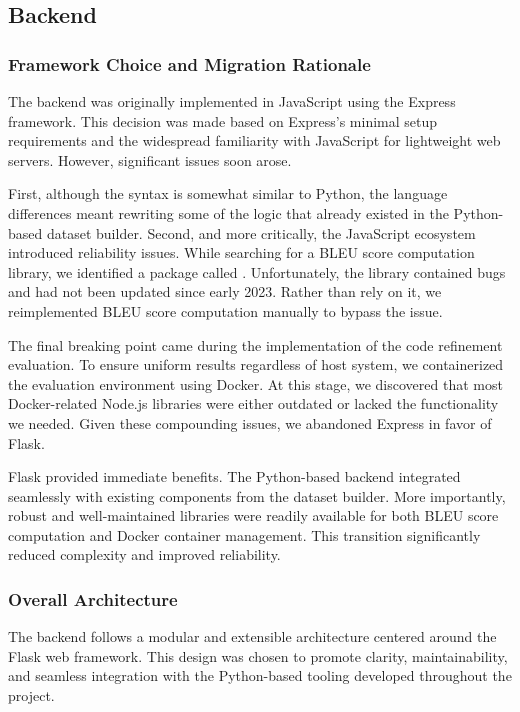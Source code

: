 \subsection{Backend}

\subsubsection{Framework Choice and Migration Rationale}

The backend was originally implemented in JavaScript using the Express framework. This decision was
made based on Express’s minimal setup requirements and the widespread familiarity with JavaScript
for lightweight web servers. However, significant issues soon arose.

First, although the syntax is somewhat similar to Python, the language differences meant rewriting
some of the logic that already existed in the Python-based dataset builder. Second, and more
critically, the JavaScript ecosystem introduced reliability issues. While searching for a BLEU score
computation library, we identified a package called  \cite{bleu-score-npmjs}.
Unfortunately, the library contained bugs and had not been updated since early 2023. Rather than
rely on it, we reimplemented BLEU score computation manually to bypass the issue.

The final breaking point came during the implementation of the code refinement evaluation. To ensure
uniform results regardless of host system, we containerized the evaluation environment using Docker.
At this stage, we discovered that most Docker-related Node.js libraries were either outdated or
lacked the functionality we needed. Given these compounding issues, we abandoned Express in favor of
Flask.

Flask provided immediate benefits. The Python-based backend integrated seamlessly with existing
components from the dataset builder. More importantly, robust and well-maintained libraries were
readily available for both BLEU score computation and Docker container management. This transition
significantly reduced complexity and improved reliability.

\subsubsection{Overall Architecture}

The backend follows a modular and extensible architecture centered around the Flask web framework.
This design was chosen to promote clarity, maintainability, and seamless integration with the
Python-based tooling developed throughout the project.

